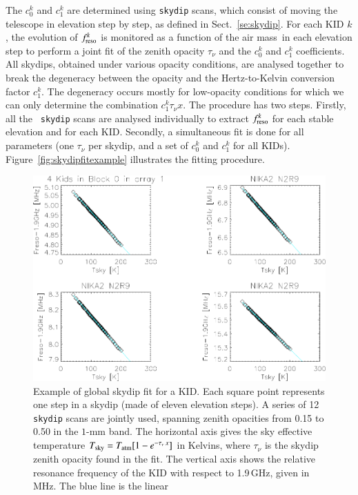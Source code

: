 \documentclass[traditionalabstract]{aa}
\newcommand{\taunu}{\tau_{\nu}}
\newcommand{\airmass}{air mass}
\newcommand{\lp}[1]{#1}
\begin{document}
{%
The $c_0^k$ and $c_1^k$ are determined using {\tt skydip} scans, which
consist of moving the telescope in elevation step by step, as
defined in Sect.~\ref{se:skydip}. For each KID $k$, the evolution
of $f_{\rm{reso}}^k$ is monitored as a function of the \airmass\ in each
elevation step to perform a joint fit of the zenith opacity $\taunu$ and
the $c_0^k$ and $c_1^k$ coefficients.
All skydips, obtained under various opacity conditions, are analysed
together to break the degeneracy between the opacity and the
Hertz-to-Kelvin conversion factor $c_1^k$. The degeneracy occurs mostly for low-opacity
conditions for which we can only determine the combination
$c_1^k \taunu x$. The procedure has two steps. Firstly, all the {\tt
skydip} scans are analysed individually to extract $f_{\rm{reso}}^k$ for each
stable elevation and for each KID. Secondly, a simultaneous fit is done
for all parameters (one $\taunu$ per skydip, and a set of $c_0^k$ and
$c_1^k$ for all KIDs). Figure~\ref{fig:skydipfitexample} illustrates the
fitting procedure.
%
\begin{figure}[!htbp]
\begin{center}
\includegraphics[trim={9cm 0cm 0cm 6.5cm}, clip=true, width=0.9\linewidth]{Figures/test_allskd4_N2R9v5_5-crop.pdf}
\caption[]{Example of global skydip fit for a KID.
Each square point represents one step in a skydip (made of eleven
elevation steps). A series of 12 {\tt skydip} scans are jointly used,
spanning zenith opacities from 0.15 to 0.50 {\lp in the $1$-mm band}. The horizontal axis gives the sky
effective temperature $T_{\rm{sky}} = T_{\rm{atm}}[1-e^{-\taunu\, x}]$ in Kelvins, where $\taunu$ is the
skydip zenith opacity found in the fit. The vertical axis shows the relative
resonance frequency of the KID with respect to 1.9\,GHz, given in MHz. The blue line is the linear
}
\end{center}
\end{figure}}
\end{document}
